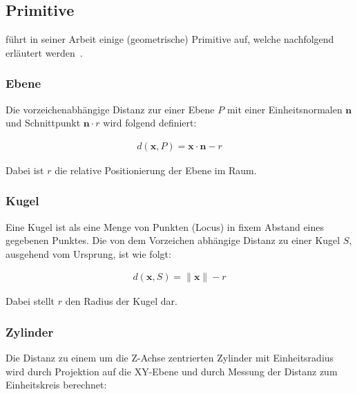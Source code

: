 
\subsection{Primitive}
\label{subsec:implicit_surfaces_primitives}

\citeauthor{hart_sphere_1994} führt in seiner Arbeit einige
(geometrische) Primitive auf, welche nachfolgend erläutert
werden~\parencite[S. 540ff]{hart_sphere_1994}.

\subsubsection{Ebene}
\label{ssubsec:implicit_surfaces_primitives_plane}

Die vorzeichenabhängige Distanz zur einer Ebene $P$ mit einer
Einheitsnormalen $\bm{n}$ und Schnittpunkt $\bm{n} \cdot r$
wird folgend definiert:

\begin{gather}
    d(\bm{x}, P) = \bm{x} \cdot \bm{n} - r
\end{gather}

Dabei ist $r$ die relative Positionierung der Ebene  im Raum. 

\subsubsection{Kugel}
\label{ssubsec:implicit_surfaces_primitives_sphere}

Eine Kugel ist als eine Menge von Punkten (Locus) in fixem Abstand eines
gegebenen Punktes. Die von dem Vorzeichen abhängige Distanz zu einer
Kugel $S$, ausgehend vom Ursprung, ist wie folgt:

\begin{gather}
    d(\bm{x}, S) = \|\bm{x}\| - r
\end{gather}

Dabei stellt $r$ den Radius der Kugel dar.

\subsubsection{Zylinder}
\label{ssubsec:implicit_surfaces_primitives_cylinder}

Die Distanz zu einem um die Z-Achse zentrierten Zylinder mit
Einheitsradius wird durch Projektion auf die XY-Ebene und durch Messung
der Distanz zum Einheitskreis berechnet:

